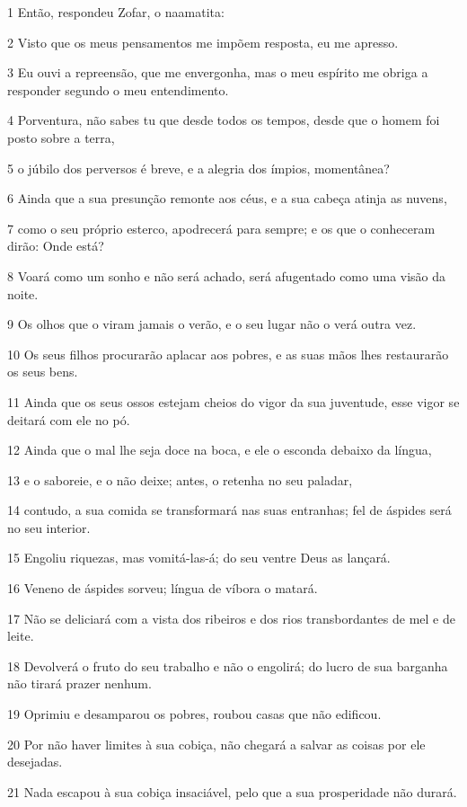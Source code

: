 \par 1 Então, respondeu Zofar, o naamatita:
\par 2 Visto que os meus pensamentos me impõem resposta, eu me apresso.
\par 3 Eu ouvi a repreensão, que me envergonha, mas o meu espírito me obriga a responder segundo o meu entendimento.
\par 4 Porventura, não sabes tu que desde todos os tempos, desde que o homem foi posto sobre a terra,
\par 5 o júbilo dos perversos é breve, e a alegria dos ímpios, momentânea?
\par 6 Ainda que a sua presunção remonte aos céus, e a sua cabeça atinja as nuvens,
\par 7 como o seu próprio esterco, apodrecerá para sempre; e os que o conheceram dirão: Onde está?
\par 8 Voará como um sonho e não será achado, será afugentado como uma visão da noite.
\par 9 Os olhos que o viram jamais o verão, e o seu lugar não o verá outra vez.
\par 10 Os seus filhos procurarão aplacar aos pobres, e as suas mãos lhes restaurarão os seus bens.
\par 11 Ainda que os seus ossos estejam cheios do vigor da sua juventude, esse vigor se deitará com ele no pó.
\par 12 Ainda que o mal lhe seja doce na boca, e ele o esconda debaixo da língua,
\par 13 e o saboreie, e o não deixe; antes, o retenha no seu paladar,
\par 14 contudo, a sua comida se transformará nas suas entranhas; fel de áspides será no seu interior.
\par 15 Engoliu riquezas, mas vomitá-las-á; do seu ventre Deus as lançará.
\par 16 Veneno de áspides sorveu; língua de víbora o matará.
\par 17 Não se deliciará com a vista dos ribeiros e dos rios transbordantes de mel e de leite.
\par 18 Devolverá o fruto do seu trabalho e não o engolirá; do lucro de sua barganha não tirará prazer nenhum.
\par 19 Oprimiu e desamparou os pobres, roubou casas que não edificou.
\par 20 Por não haver limites à sua cobiça, não chegará a salvar as coisas por ele desejadas.
\par 21 Nada escapou à sua cobiça insaciável, pelo que a sua prosperidade não durará.

